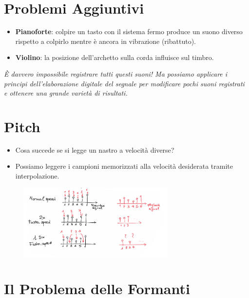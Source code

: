 \section{Problemi Aggiuntivi}

\begin{itemize}
    \item \textbf{Pianoforte}: colpire un tasto con il sistema fermo produce un suono diverso rispetto a colpirlo mentre è ancora in vibrazione (ribattuto).
    \item \textbf{Violino}: la posizione dell'archetto sulla corda influisce sul timbro.
\end{itemize}

\noindent
\textit{È davvero impossibile registrare tutti questi suoni! Ma possiamo applicare i principi dell'elaborazione digitale del segnale per modificare pochi suoni registrati e ottenere una grande varietà di risultati.}

\section{Pitch}

\begin{itemize}
    \item Cosa succede se si legge un nastro a velocità diverse?
    \item Possiamo leggere i campioni memorizzati alla velocità desiderata tramite interpolazione.
\end{itemize}
\begin{figure}[H]
    \centering
    \includegraphics[width=0.7\textwidth]{capitoli/capitolo13/immagini/image2.png}
\end{figure}

\section{Il Problema delle Formanti}

